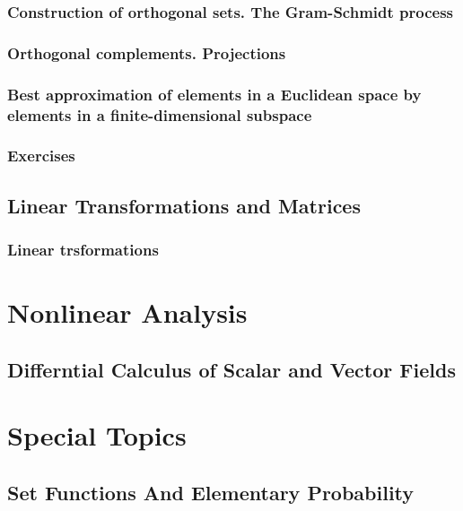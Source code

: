 \documentclass[cn,11pt,chinese]{elegantbook}
\numberwithin{equation}{section}
\begin{document}
\section{Construction of orthogonal sets. The Gram-Schmidt process}


\section{Orthogonal complements. Projections}


\section{Best approximation of elements in a Euclidean space by elements in a finite-dimensional subspace}


\section{Exercises}


\chapter{Linear Transformations and Matrices}
\section{Linear trsformations}




\part{Nonlinear Analysis}
\chapter{Differntial Calculus of Scalar and Vector Fields}





\part{Special Topics}
\chapter{Set Functions And Elementary Probability}







% 

\appendix
\end{document}
